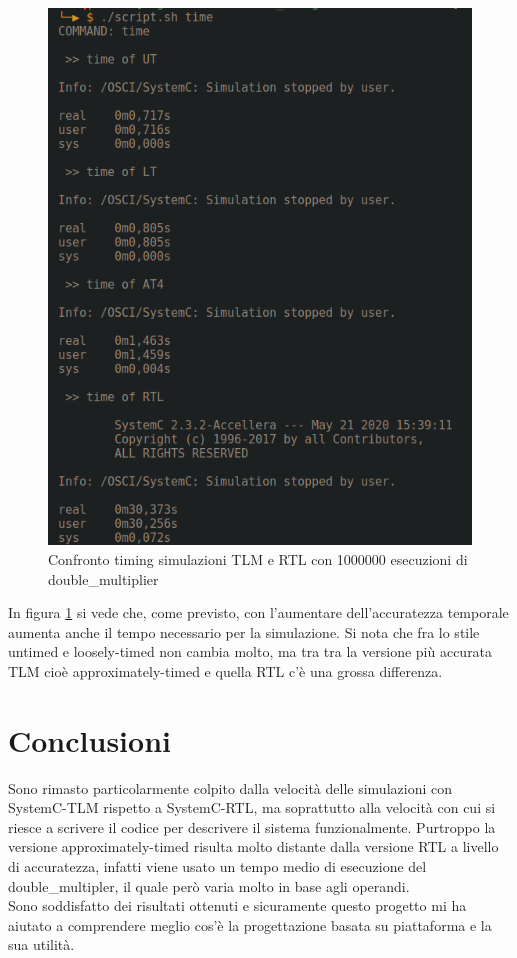 \documentclass[]{IEEEtran}
\begin{document}
\begin{figure}[!htb]
    \centering
    \includegraphics[width=0.9\linewidth]{figures/SIM_TLM_timing.png}
    \caption{Confronto timing simulazioni TLM e RTL con 1000000 esecuzioni di double\_multiplier}
    \label{fig:SIM_TLM_TIME}
\end{figure}
In figura \ref{fig:SIM_TLM_TIME} si vede che, come previsto, con l'aumentare dell'accuratezza temporale aumenta anche il tempo necessario per la simulazione. Si nota che fra lo stile untimed e loosely-timed non cambia molto, ma tra tra la versione più accurata TLM cioè approximately-timed e quella RTL c'è una grossa differenza.



\section{Conclusioni}
Sono rimasto particolarmente colpito dalla velocità delle simulazioni con SystemC-TLM rispetto a SystemC-RTL, ma soprattutto alla velocità con cui si riesce a scrivere il codice per descrivere il sistema funzionalmente. Purtroppo la versione approximately-timed risulta molto distante dalla versione RTL a livello di accuratezza, infatti viene usato un tempo medio di esecuzione del double\_multipler, il quale però varia molto in base agli operandi.
\\Sono soddisfatto dei risultati ottenuti e sicuramente questo progetto mi ha aiutato a comprendere meglio cos'è la progettazione basata su piattaforma e la sua utilità.
\end{document}
